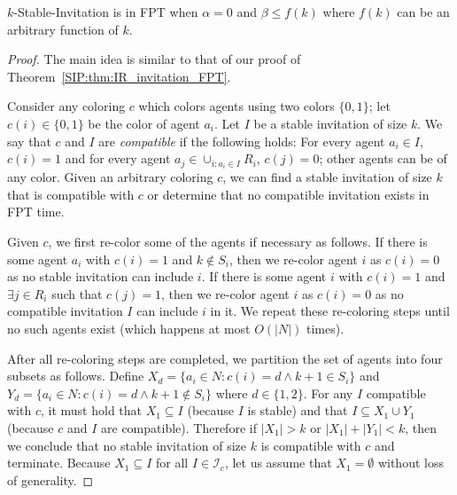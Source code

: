 \begin{theorem} \label{SIP:thm:stable_FPT}
	$k$-Stable-Invitation is in FPT when $\alpha = 0$ and $\beta \leq f(k)$ where $f(k)$ can be an arbitrary function of $k$.
\end{theorem}
\begin{proof}
	The main idea is similar to that of our proof of Theorem~\ref{SIP:thm:IR_invitation_FPT}. 

	Consider any coloring $c$ which colors agents using two colors $\{0, 1\}$; let $c(i)\in \{0,1\}$ be the color of agent $a_i$. Let $I$ be a stable invitation of size $k$. We say that $c$ and $I$ are {\em compatible} if the following holds: For every agent $a_i\in I$, $c(i) = 1$ and for every agent $a_j\in \cup_{i: a_i\in I} R_i$, $c(j) = 0$; other agents can be of any color. 
	Given an arbitrary coloring $c$, we can find a stable invitation of size $k$ that is compatible with $c$ or determine that no compatible invitation exists in FPT time. 

	Given $c$, we first re-color some of the agents if necessary as follows. If there is some agent $a_i$ with $c(i) = 1$ and $k\not\in S_i$, then we re-color agent $i$ as $c(i) = 0$ as no stable invitation can include $i$. If there is some agent $i$ with $c(i) = 1$ and $\exists j\in R_i$ such that $c(j) = 1$, then we re-color agent $i$ as $c(i) = 0$ as no compatible invitation $I$ can include $i$ in it. We repeat these re-coloring steps until no such agents exist (which happens at most $O(|N|)$ times). 
	
	After all re-coloring steps are completed, we partition the set of agents into four subsets as follows. Define $X_d = \{a_i\in N : c(i) = d \land k+1\in S_i\}$ and $Y_d = \{a_i\in N : c(i) = d \land k+1\not\in S_i\}$ where $d\in \{1, 2\}$.
	For any $I$ compatible with $c$, it must hold that $X_1 \subseteq I$ (because $I$ is stable) and that $I \subseteq X_1 \cup Y_1$ (because $c$ and $I$ are compatible). 
	Therefore if $|X_1| > k$ or $|X_1| + |Y_1| < k$, then we conclude that no stable invitation of size $k$ is compatible with $c$ and terminate. Because $X_1 \subseteq I$ for all $I\in \mathcal{I}_c$, let us assume that $X_1 = \emptyset$ without loss of generality.
	

\end{proof}
